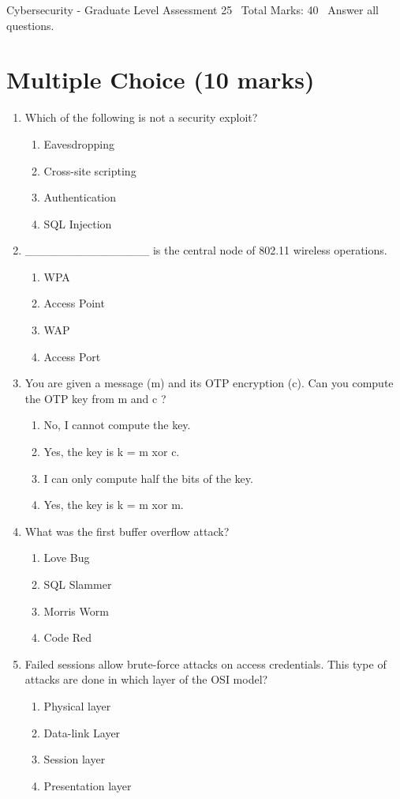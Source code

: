\documentclass[12pt]{article}
\begin{document}
\begin{center}
Cybersecurity - Graduate Level Assessment 25 \
Total Marks: 40 \
Answer all questions.
\end{center}

\section*{Multiple Choice (10 marks)}
\begin{enumerate}[label=\arabic*.]
\item Which of the following is not a security exploit?
\begin{enumerate}[label=(\alph*)]
    \item Eavesdropping
    \item Cross-site scripting
    \item Authentication
    \item SQL Injection
\end{enumerate}
\item \_\_\_\_\_\_\_\_\_\_\_\_\_\_\_ is the central node of 802.11 wireless operations.
\begin{enumerate}[label=(\alph*)]
    \item WPA
    \item Access Point
    \item WAP
    \item Access Port
\end{enumerate}
\item You are given a message (m) and its OTP encryption (c). Can you compute the OTP key from m and c ?
\begin{enumerate}[label=(\alph*)]
    \item No, I cannot compute the key.
    \item Yes, the key is k = m xor c.
    \item I can only compute half the bits of the key.
    \item Yes, the key is k = m xor m.
\end{enumerate}
\item What was the first buffer overflow attack?
\begin{enumerate}[label=(\alph*)]
    \item Love Bug
    \item SQL Slammer
    \item Morris Worm
    \item Code Red
\end{enumerate}
\item Failed sessions allow brute-force attacks on access credentials. This type of attacks are done in which layer of the OSI model?
\begin{enumerate}[label=(\alph*)]
    \item Physical layer
    \item Data-link Layer
    \item Session layer
    \item Presentation layer
\end{enumerate}
\end{enumerate}
\end{document}
